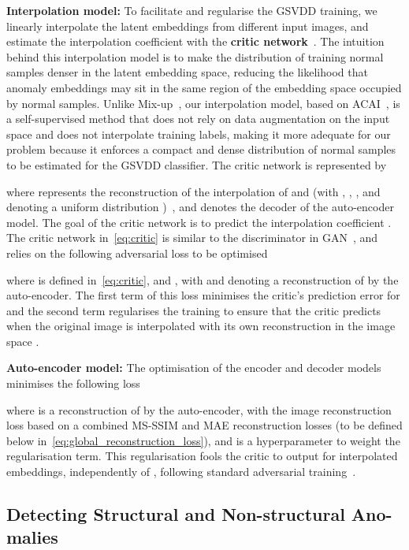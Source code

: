 \documentclass[final]{cvpr}
\begin{document}
\textbf{Interpolation model:} To facilitate and regularise the GSVDD training, we linearly interpolate the latent embeddings from different input images, and estimate the interpolation coefficient with the \textbf{critic network}~\cite{berthelot2018understanding}.
The intuition behind this interpolation model
is to make the distribution of training normal samples denser in the latent embedding space, reducing the likelihood that anomaly embeddings may sit in the same region of the embedding space occupied by normal samples.
Unlike Mix-up~\cite{zhang2017mixup}, our  interpolation model, based on ACAI~\cite{berthelot2018understanding}, is a self-supervised method that does not rely on data augmentation on the input space and does not interpolate training labels, making it more adequate for our problem because it enforces a compact and dense distribution of normal samples to be estimated for the GSVDD classifier. 
The critic network is represented by

where  
represents the reconstruction of the interpolation of  and  (with , ,  , and  denoting a uniform distribution )~\cite{berthelot2018understanding}, and  denotes the decoder of the auto-encoder model. The goal of the critic network  is to predict the interpolation coefficient . 
The critic network in~\eqref{eq:critic} is similar to the discriminator in GAN~\cite{gan}, and relies on the following adversarial loss to be optimised~\cite{berthelot2018understanding}

where 
 is defined in~\eqref{eq:critic}, and
, with 
and  denoting a reconstruction of  by the auto-encoder.
The first term of this loss minimises the critic's prediction error for  and the second term regularises the training to ensure that the critic predicts  when the original image is interpolated with its own reconstruction in the image space . 


\textbf{Auto-encoder model:} The optimisation of the encoder and decoder models minimises the following loss

where  is a reconstruction of  by the auto-encoder, with the image reconstruction loss  based on a combined MS-SSIM and MAE reconstruction losses (to be defined below  in~\eqref{eq:global_reconstruction_loss}), and
 is a hyperparameter to weight the regularisation term. This regularisation fools the critic to output  for interpolated embeddings, independently of , following standard adversarial training~\cite{gan}.



\subsection{Detecting Structural and Non-structural Ano- malies}
\label{sec:MS-SSIM_MAE}
\end{document}
